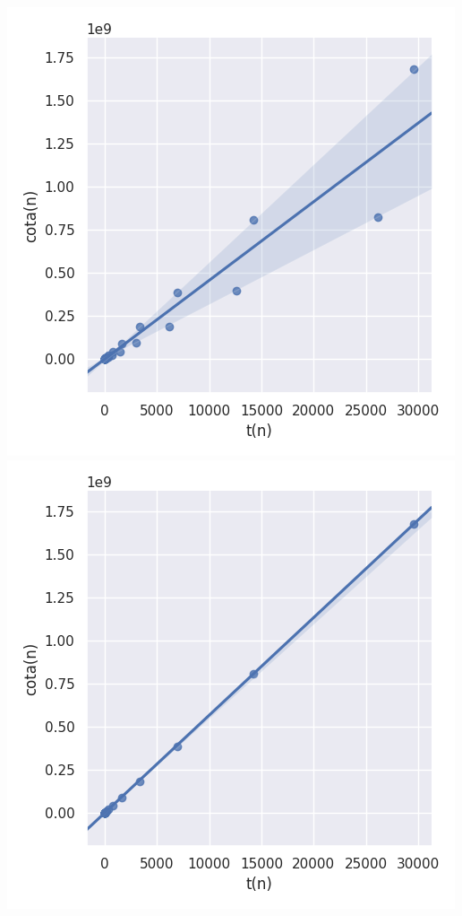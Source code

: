 \documentclass[a4paper]{article}
\begin{document}
\begin{center}
    \includegraphics[scale=0.415]{mitmCasoPeor.png}
	\includegraphics[scale=0.415]{mitmParesPeor.png}

\end{center}
\end{document}
